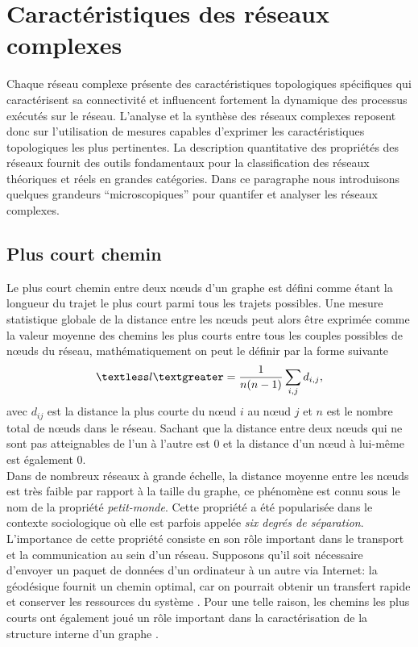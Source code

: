 \section{Caractéristiques des réseaux complexes}
Chaque réseau complexe présente des caractéristiques topologiques spécifiques qui caractérisent sa
connectivité et influencent fortement la dynamique des processus exécutés sur le réseau. L'analyse  et 
la synthèse des réseaux complexes reposent donc sur l'utilisation de mesures capables d'exprimer les caractéristiques
topologiques les plus pertinentes. La description quantitative des propriétés des réseaux fournit des
outils fondamentaux pour la classification des réseaux théoriques et réels en grandes catégories. Dans ce paragraphe 
nous introduisons quelques grandeurs ``microscopiques'' pour quantifer et analyser les réseaux complexes.

   \subsection{Plus court chemin}
   
   Le plus court chemin entre deux nœuds d'un graphe est défini comme étant la longueur du trajet le plus court parmi tous les trajets possibles. Une
   mesure statistique globale de la distance entre les nœuds peut alors être exprimée comme la valeur moyenne des chemins les
   plus courts entre tous les couples possibles de nœuds du réseau, mathématiquement on peut le définir par la forme suivante
   \begin{equation}
    \textless l\textgreater=\frac{1}{n(n-1)}\sum_{i,j} d_{i,j},
   \end{equation}
   avec $d_{ij}$ est la distance la plus courte du nœud $i$ au nœud $j$ et $n$ est le nombre total de nœuds dans le réseau. Sachant que la distance entre deux nœuds qui ne sont pas atteignables de l'un à l'autre est $0$  et la distance d'un nœud à lui-même est également $0$.\\
   Dans de nombreux réseaux à grande échelle, la distance moyenne entre les nœuds est très faible par rapport à la taille du graphe, ce phénomène est connu sous le nom de la propriété \textit{petit-monde}. Cette propriété a été popularisée dans le contexte sociologique où elle est parfois appelée \textit{six degrés de séparation}\cite{Mi1967}.\\
   L'importance de cette propriété consiste en son rôle important dans le transport et la communication au sein d'un réseau. Supposons qu'il soit nécessaire d'envoyer un paquet de données d'un ordinateur à un autre via Internet: la géodésique fournit un chemin  optimal, car on pourrait obtenir un transfert rapide et conserver les ressources du système \cite{PV2004}. Pour une telle raison, les chemins les plus courts ont également joué un rôle important dans la caractérisation de la structure interne d'un graphe \cite{Wa1994,JS2000,Bo-al2006}.

